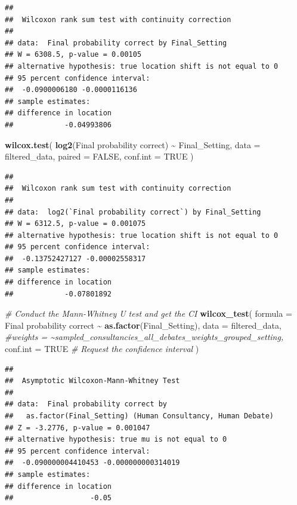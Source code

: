 \documentclass[
]{article}
\newenvironment{Shaded}{\begin{snugshade}}{\end{snugshade}}
\newcommand{\AttributeTok}[1]{\textcolor[rgb]{0.13,0.29,0.53}{#1}}
\newcommand{\CommentTok}[1]{\textcolor[rgb]{0.56,0.35,0.01}{\textit{#1}}}
\newcommand{\ConstantTok}[1]{\textcolor[rgb]{0.56,0.35,0.01}{#1}}
\newcommand{\FunctionTok}[1]{\textcolor[rgb]{0.13,0.29,0.53}{\textbf{#1}}}
\newcommand{\NormalTok}[1]{#1}
\newcommand{\SpecialCharTok}[1]{\textcolor[rgb]{0.81,0.36,0.00}{\textbf{#1}}}
\newcommand{\StringTok}[1]{\textcolor[rgb]{0.31,0.60,0.02}{#1}}
\begin{document}
\begin{verbatim}
## 
##  Wilcoxon rank sum test with continuity correction
## 
## data:  Final probability correct by Final_Setting
## W = 6308.5, p-value = 0.00105
## alternative hypothesis: true location shift is not equal to 0
## 95 percent confidence interval:
##  -0.0900006180 -0.0000116136
## sample estimates:
## difference in location 
##            -0.04993806
\end{verbatim}

\begin{Shaded}
\begin{Highlighting}[]
\FunctionTok{wilcox.test}\NormalTok{(}
  \FunctionTok{log2}\NormalTok{(}\StringTok{\textasciigrave{}}\AttributeTok{Final probability correct}\StringTok{\textasciigrave{}}\NormalTok{) }\SpecialCharTok{\textasciitilde{}}\NormalTok{ Final\_Setting, }
  \AttributeTok{data =}\NormalTok{ filtered\_data,}
  \AttributeTok{paired =} \ConstantTok{FALSE}\NormalTok{,}
  \AttributeTok{conf.int =} \ConstantTok{TRUE}
\NormalTok{)}
\end{Highlighting}
\end{Shaded}

\begin{verbatim}
## 
##  Wilcoxon rank sum test with continuity correction
## 
## data:  log2(`Final probability correct`) by Final_Setting
## W = 6312.5, p-value = 0.001075
## alternative hypothesis: true location shift is not equal to 0
## 95 percent confidence interval:
##  -0.13752427127 -0.00002558317
## sample estimates:
## difference in location 
##            -0.07801892
\end{verbatim}

\begin{Shaded}
\begin{Highlighting}[]
\CommentTok{\# Conduct the Mann{-}Whitney U test and get the CI}
\FunctionTok{wilcox\_test}\NormalTok{(}
  \AttributeTok{formula =} \StringTok{\textasciigrave{}}\AttributeTok{Final probability correct}\StringTok{\textasciigrave{}} \SpecialCharTok{\textasciitilde{}} \FunctionTok{as.factor}\NormalTok{(Final\_Setting), }
  \AttributeTok{data =}\NormalTok{ filtered\_data,}
  \CommentTok{\#weights = \textasciitilde{}sampled\_consultancies\_all\_debates\_weights\_grouped\_setting,}
  \AttributeTok{conf.int =} \ConstantTok{TRUE}  \CommentTok{\# Request the confidence interval}
\NormalTok{)}
\end{Highlighting}
\end{Shaded}

\begin{verbatim}
## 
##  Asymptotic Wilcoxon-Mann-Whitney Test
## 
## data:  Final probability correct by
##   as.factor(Final_Setting) (Human Consultancy, Human Debate)
## Z = -3.2776, p-value = 0.001047
## alternative hypothesis: true mu is not equal to 0
## 95 percent confidence interval:
##  -0.090000004410453 -0.000000000314019
## sample estimates:
## difference in location 
##                  -0.05
\end{verbatim}
\end{document}

